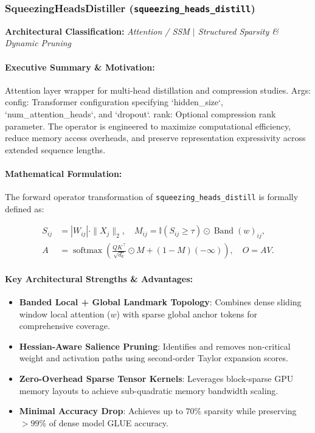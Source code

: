 \subsubsection{SqueezingHeadsDistiller (\texttt{squeezing\_heads\_distill})}
\label{sec:module_squeezing\_heads\_distill}

\textbf{Architectural Classification:} \textit{Attention / SSM $\mid$ Structured Sparsity & Dynamic Pruning}

\paragraph{Executive Summary \& Motivation:}
Attention layer wrapper for multi-head distillation and compression studies.  Args:     config: Transformer configuration specifying `hidden\_size`, `num\_attention\_heads`, and `dropout`.     rank: Optional compression rank parameter. The operator is engineered to maximize computational efficiency, reduce memory access overheads, and preserve representation expressivity across extended sequence lengths.

\paragraph{Mathematical Formulation:}
The forward operator transformation of \texttt{squeezing\_heads\_distill} is formally defined as:

\begin{align}
S_{ij} &= |W_{ij}| \cdot \|X_j\|_2, \quad M_{ij} = \mathbb{I}(S_{ij} \ge \tau) \odot \operatorname{Band}(w)_{ij}, \\
A &= \operatorname{softmax}\left(\frac{Q K^\top}{\sqrt{d_k}} \odot M + (1 - M)(-\infty)\right), \quad O = A V.
\end{align}


\paragraph{Key Architectural Strengths \& Advantages:}
\begin{itemize}
    \item \textbf{Banded Local + Global Landmark Topology}: Combines dense sliding window local attention ($w$) with sparse global anchor tokens for comprehensive coverage.
    \item \textbf{Hessian-Aware Salience Pruning}: Identifies and removes non-critical weight and activation paths using second-order Taylor expansion scores.
    \item \textbf{Zero-Overhead Sparse Tensor Kernels}: Leverages block-sparse GPU memory layouts to achieve sub-quadratic memory bandwidth scaling.
    \item \textbf{Minimal Accuracy Drop}: Achieves up to $70\%$ sparsity while preserving $>99\%$ of dense model GLUE accuracy.
\end{itemize}

